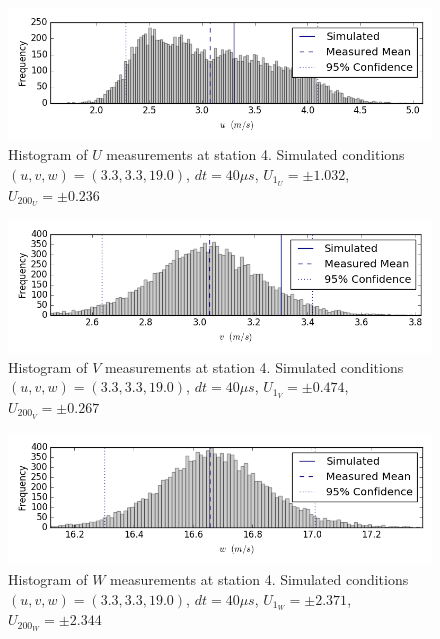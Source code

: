 \begin{figure}[H]
\centering
\includegraphics[width=6in]{figs/Ely_May28th04002/uncertainty_Ely_May28th04002_U}
\caption{Histogram of $U$ measurements at station 4. Simulated conditions $(u,v,w)=(3.3, 3.3, 19.0)$, $dt=40 \mu s$, $U_{1_{U}}=\pm 1.032$, $U_{200_{U}}=\pm 0.236$}
\label{fig:uncertainty_Ely_May28th04002_U}
\end{figure}


\begin{figure}[H]
\centering
\includegraphics[width=6in]{figs/Ely_May28th04002/uncertainty_Ely_May28th04002_V}
\caption{Histogram of $V$ measurements at station 4. Simulated conditions $(u,v,w)=(3.3, 3.3, 19.0)$, $dt=40 \mu s$, $U_{1_{V}}=\pm 0.474$, $U_{200_{V}}=\pm 0.267$}
\label{fig:uncertainty_Ely_May28th04002_V}
\end{figure}


\begin{figure}[H]
\centering
\includegraphics[width=6in]{figs/Ely_May28th04002/uncertainty_Ely_May28th04002_W}
\caption{Histogram of $W$ measurements at station 4. Simulated conditions $(u,v,w)=(3.3, 3.3, 19.0)$, $dt=40 \mu s$, $U_{1_{W}}=\pm 2.371$, $U_{200_{W}}=\pm 2.344$}
\label{fig:uncertainty_Ely_May28th04002_W}
\end{figure}


